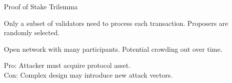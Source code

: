 \documentclass[handout]{beamer}
\begin{document}
	\begin{frame}{Proof of Stake Trilemma}
		\begin{center}
			\begin{tikzpicture}[scale=0.6, every node/.style ={scale=0.8}]
				
			\end{tikzpicture}
		\end{center}
		
		\begin{description}[labelwidth=10em]
			\item[\textbf{Scalability}] Only a subset of validators need to process each transaction. Proposers are randomly selected.
			\item[\textbf{Decentralization}] Open network with many participants. Potential crowding out over time.
			\item[\textbf{Security}] Pro: Attacker must acquire protocol asset.\\ Con: Complex design may introduce new attack vectors.
		\end{description}
	\end{frame}
	
\end{document}

